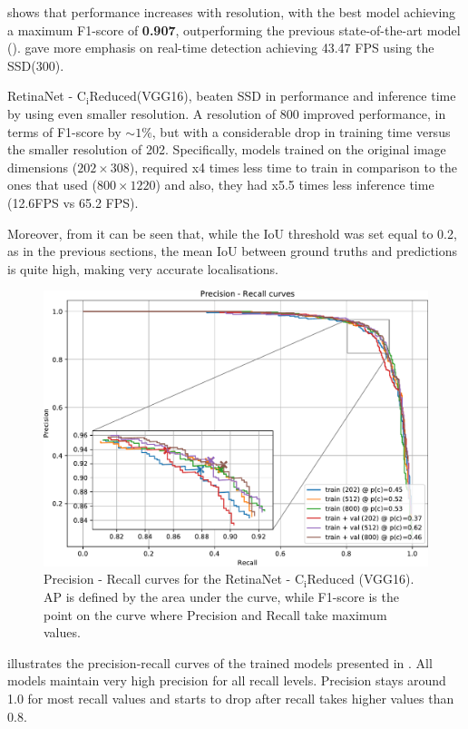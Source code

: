  shows that performance increases with resolution, with the best model achieving a maximum F1-score of \textbf{0.907}, outperforming the previous state-of-the-art model (\cite{bargoti2017deep}). \cite{liang2018apple} gave more emphasis on real-time detection achieving 43.47 FPS using the SSD(300).

RetinaNet - $\text{C}_\text{i}\text{Reduced}$(VGG16), beaten SSD in performance and inference time by using even smaller resolution. A resolution of 800 improved performance, in terms of F1-score by $\sim1\%$, but with a considerable drop in training time versus the smaller resolution of 202. Specifically, models trained on the original image dimensions ($202\times308$), required x4 times less time to train in comparison to the ones that used ($800\times1220$) and also, they had x5.5 times less inference time (12.6FPS vs 65.2 FPS).

Moreover, from  it can be seen that, while the IoU threshold was set equal to 0.2, as in the previous sections, the mean IoU between ground truths and predictions is quite high, making very accurate localisations.

\begin{figure}[!htb]
  \centering
  \includegraphics[width=\textwidth]{figures/ch3/fig10.pdf}
  \caption{Precision - Recall curves for the RetinaNet - $\text{C}_\text{i}\text{Reduced}$ (VGG16). AP is defined by the area under the curve, while F1-score is the point on the curve where Precision and Recall take maximum values.}
  \label{fig10}
\end{figure} 

 illustrates the precision-recall curves of the trained models presented in . All models maintain very high precision for all recall levels. Precision stays around 1.0 for most recall values and starts to drop after recall takes higher values than 0.8.

